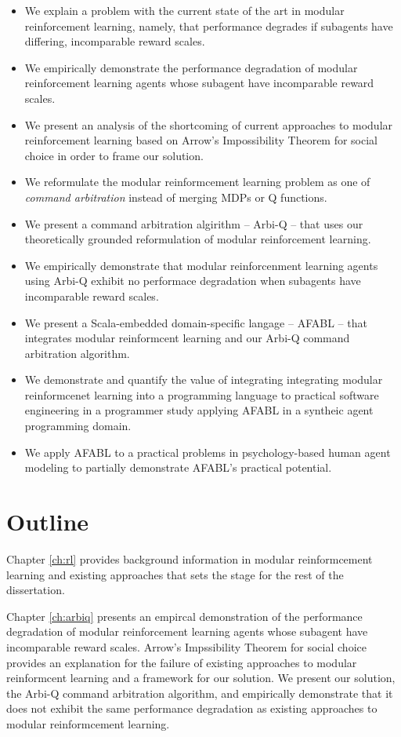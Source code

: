 \begin{itemize}
\item We explain a problem with the current state of the art in modular reinforcement learning, namely, that performance degrades if subagents have differing, incomparable reward scales.
\item We empirically demonstrate the performance degradation of modular reinforcement learning agents whose subagent have incomparable reward scales.
\item We present an analysis of the shortcoming of current approaches to modular reinforcement learning based on Arrow's Impossibility Theorem for social choice in order to frame our solution.
\item We reformulate the modular reinformcement learning problem as one of {\it command arbitration} instead of merging MDPs or Q functions.
\item We present a command arbitration algirithm -- Arbi-Q -- that uses our theoretically grounded reformulation of modular reinforcement learning.
\item We empirically demonstrate that modular reinforcenment learning agents using Arbi-Q exhibit no performace degradation when subagents have incomparable reward scales.
\item We present a Scala-embedded domain-specific langage -- AFABL -- that integrates modular reinformcent learning and our Arbi-Q command arbitration algorithm.
\item We demonstrate and quantify the value of integrating integrating modular reinformcenet learning into a programming language to practical software engineering in a programmer study applying AFABL in a syntheic agent programming domain.
\item We apply AFABL to a practical problems in psychology-based human agent modeling to partially demonstrate AFABL's practical potential.
\end{itemize}

\section{Outline}

Chapter \ref{ch:rl} provides background information in modular reinformcement learning and existing approaches that sets the stage for the rest of the dissertation.

Chapter \ref{ch:arbiq} presents an empircal demonstration of the performance degradation of modular reinforcement learning agents whose subagent have incomparable reward scales. Arrow's Impssibility Theorem for social choice provides an explanation for the failure of existing approaches to modular reinformcent learning and a framework for our solution. We present our solution, the Arbi-Q command arbitration algorithm, and empirically demonstrate that it does not exhibit the same performance degradation as existing approaches to modular reinformcement learning.

